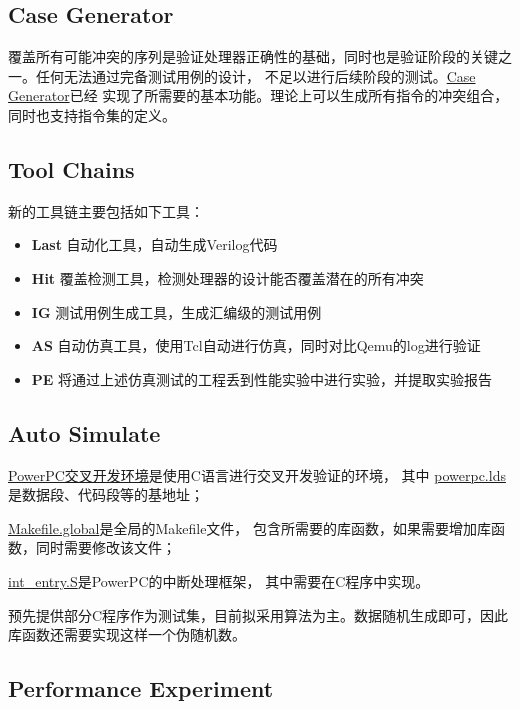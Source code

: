 \documentclass[hyperref,UTF8]{ctexart}
\theoremstyle{definition}
\theoremstyle{remark}
\numberwithin{equation}{subsection}
\newcommand{\Emph}{\textbf}
\begin{document}
\subsection{Case Generator}

	覆盖所有可能冲突的序列是验证处理器正确性的基础，同时也是验证阶段的关键之一。任何无法通过完备测试用例的设计，
	不足以进行后续阶段的测试。\href{https://github.com/Turf1013/PPC_AutoTool/tree/master/IG}{Case Generator}已经
	实现了所需要的基本功能。理论上可以生成所有指令的冲突组合，同时也支持指令集的定义。

\subsection{Tool Chains}
	
	新的工具链主要包括如下工具：
	\begin{itemize}
		\item \Emph{Last} 自动化工具，自动生成Verilog代码
		\item \Emph{Hit} 覆盖检测工具，检测处理器的设计能否覆盖潜在的所有冲突
		\item \Emph{IG} 测试用例生成工具，生成汇编级的测试用例
		\item \Emph{AS} 自动仿真工具，使用Tcl自动进行仿真，同时对比Qemu的log进行验证
		\item \Emph{PE} 将通过上述仿真测试的工程丢到性能实验中进行实验，并提取实验报告
	\end{itemize}
	
\subsection{Auto Simulate}

	\href{https://github.com/Turf1013/PPC_AutoTool/tree/master/PPC}{PowerPC交叉开发环境}是使用C语言进行交叉开发验证的环境，
	其中
	\href{https://github.com/Turf1013/PPC_AutoTool/blob/master/PPC/global/powerpc.lds}{powerpc.lds}是数据段、代码段等的基地址；
	
	\href{https://github.com/Turf1013/PPC_AutoTool/blob/master/PPC/global/Makefile.global}{Makefile.global}是全局的Makefile文件，
	包含所需要的库函数，如果需要增加库函数，同时需要修改该文件；
	
	\href{https://github.com/Turf1013/PPC_AutoTool/blob/master/PPC/global/int_entry.S}{int\_entry.S}是PowerPC的中断处理框架，
	其中需要在C程序中实现。
	
	预先提供部分C程序作为测试集，目前拟采用算法为主。数据随机生成即可，因此库函数还需要实现这样一个伪随机数。

\subsection{Performance Experiment}
	
\end{document}
